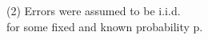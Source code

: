 \documentclass[preview]{standalone}
\begin{document}
\begin{center}
(2) Errors were assumed to be i.i.d.\\ for some fixed and known probability p.
\end{center}
\end{document}
